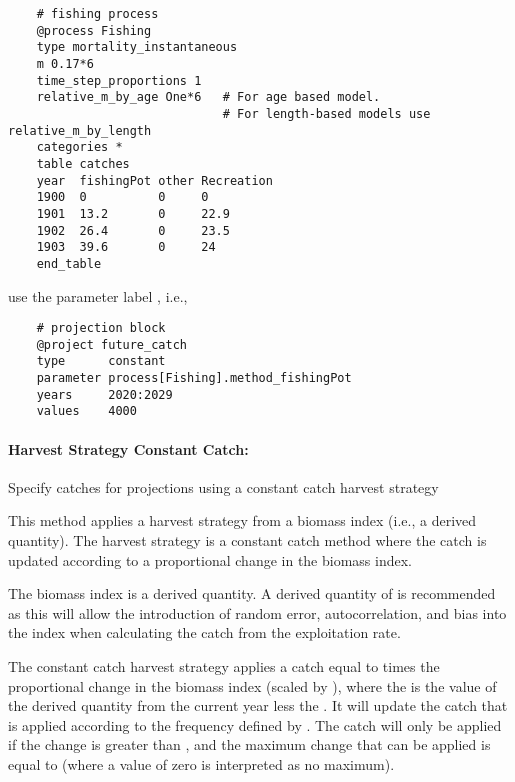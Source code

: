 {\small{\begin{verbatim}
	# fishing process
	@process Fishing
	type mortality_instantaneous
	m 0.17*6
	time_step_proportions 1
	relative_m_by_age One*6   # For age based model. 
	                          # For length-based models use relative_m_by_length
	categories *
	table catches
	year  fishingPot other Recreation
	1900  0          0     0
	1901  13.2       0     22.9
	1902  26.4       0     23.5
	1903  39.6       0     24
	end_table
\end{verbatim}}}

use the parameter label	, i.e., 

{\small{\begin{verbatim}
	# projection block
	@project future_catch
	type      constant
	parameter process[Fishing].method_fishingPot
	years     2020:2029
	values    4000
\end{verbatim}}}

\paragraph[HarvestStrategyConstantCatch]{Harvest Strategy Constant Catch:} Specify catches for projections using a constant catch harvest strategy  \label{sec:Project-HarvestStrategyConstantCatch} 

This method applies a harvest strategy from a biomass index (i.e., a derived quantity). The harvest strategy is a constant catch method where the catch is updated according to a proportional change in the biomass index. 

The biomass index is a derived quantity. A derived quantity of  is recommended as this will allow the introduction of random error, autocorrelation, and bias into the index when calculating the catch from the exploitation rate.

The constant catch harvest strategy applies a catch equal to  times the proportional change in the biomass index (scaled by ), where the  is the value of the derived quantity from the current year less the . It will update the catch that is applied according to the frequency defined by . The catch will only be applied if the change is greater than , and the maximum change that can be applied is equal to  (where a value of zero is interpreted as no maximum). 


